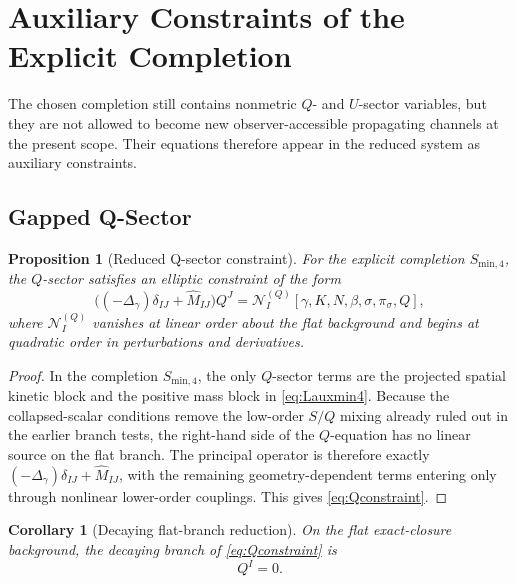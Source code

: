 \documentclass[11pt]{article}
\newtheorem{proposition}{Proposition}
\newtheorem{corollary}{Corollary}
\begin{document}
\section{Auxiliary Constraints of the Explicit Completion}

The chosen completion still contains nonmetric \(Q\)- and \(U\)-sector variables, but they are not allowed to become new observer-accessible propagating channels at the present scope. Their equations therefore appear in the reduced system as auxiliary constraints.

\subsection{Gapped Q-Sector}

\begin{proposition}[Reduced Q-sector constraint]
For the explicit completion \(S_{\mathrm{min},4}\), the \(Q\)-sector satisfies an elliptic constraint of the form
\begin{equation}
\bigl((-\Delta_\gamma)\delta_{IJ}+\widehat M_{IJ}\bigr)Q^J
=
\mathcal N_I^{(Q)}[\gamma,K,N,\beta,\sigma,\pi_\sigma,Q],
\label{eq:Qconstraint}
\end{equation}
where \(\mathcal N_I^{(Q)}\) vanishes at linear order about the flat background and begins at quadratic order in perturbations and derivatives.
\end{proposition}

\begin{proof}
In the completion \(S_{\mathrm{min},4}\), the only \(Q\)-sector terms are the projected spatial kinetic block and the positive mass block in \eqref{eq:Lauxmin4}. Because the collapsed-scalar conditions remove the low-order \(S/Q\) mixing already ruled out in the earlier branch tests, the right-hand side of the \(Q\)-equation has no linear source on the flat branch. The principal operator is therefore exactly \((-\Delta_\gamma)\delta_{IJ}+\widehat M_{IJ}\), with the remaining geometry-dependent terms entering only through nonlinear lower-order couplings. This gives \eqref{eq:Qconstraint}.
\end{proof}

\begin{corollary}[Decaying flat-branch reduction]
On the flat exact-closure background, the decaying branch of \eqref{eq:Qconstraint} is
\begin{equation}
Q^I=0.
\label{eq:Qzero}
\end{equation}
\end{corollary}
\end{document}
